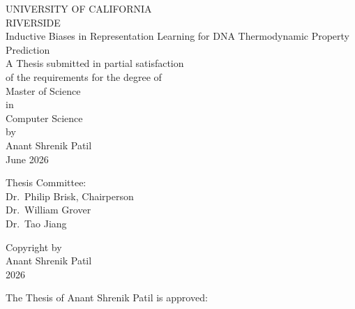 \documentclass[12pt,oneside,letterpaper]{report}
\begin{document}
\setcounter{page}{1}

\thispagestyle{empty}
\begin{center}
    UNIVERSITY OF CALIFORNIA \\
    RIVERSIDE \\
    \vspace{1in}
    Inductive Biases in Representation Learning for DNA Thermodynamic Property Prediction \\
    \vspace{1in}
    A Thesis submitted in partial satisfaction \\
    of the requirements for the degree of \\
    \vspace{0.5in}
    Master of Science \\
    \vspace{0.1in}
    in \\
    \vspace{0.1in}
    Computer Science \\
    \vspace{0.5in}
    by \\
    \vspace{0.5in}
    Anant Shrenik Patil \\
    \vspace{0.5in}
    June 2026
\end{center}
\vfill
\noindent
Thesis Committee: \\
\hspace*{0.5in}Dr.\ Philip Brisk, Chairperson \\
\hspace*{0.5in}Dr.\ William Grover \\
\hspace*{0.5in}Dr.\ Tao Jiang
\clearpage

\thispagestyle{empty}
\vspace*{7.5in}
\begin{center}
    Copyright by \\
    Anant Shrenik Patil \\
    2026
\end{center}
\clearpage

\thispagestyle{empty}
\vspace*{0.5in}
\noindent The Thesis of Anant Shrenik Patil is approved:
\end{document}
